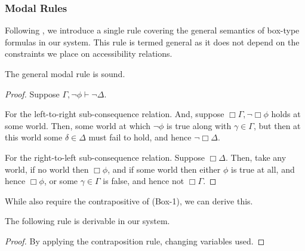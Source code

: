 \documentclass[10pt]{article}
\begin{document}
\subsubsection{Modal Rules}
\label{sec:modal-rules}

Following \citeauthor{Jaspars:1996aa}, we introduce a single rule covering the general semantics of box-type formulas in our system.
This rule is termed general as it does not depend on the constraints we place on accessibility relations.


\begin{lemma}[Soundness]
  The general modal rule is sound.
  \begin{proof}
    Suppose \(\Gamma,\lnot\phi \vdash \lnot\Delta\).

    For the left-to-right sub-consequence relation. And, suppose \(\Box\Gamma, \lnot\Box\phi\) holds at some world. Then, some world at which \(\lnot\phi\) is true along with \(\gamma \in \Gamma\), but then at this world some \(\delta \in \Delta\) must fail to hold, and hence \(\lnot\Box\Delta\).

    For the right-to-left sub-consequence relation. Suppose \(\Box\Delta\). Then, take any world, if no world then \(\Box\phi\), and if some world then either \(\phi\) is true at all, and hence \(\Box\phi\), or some \(\gamma \in \Gamma\) is false, and hence not \(\Box\Gamma\).
  \end{proof}
\end{lemma}

While \citeauthor{Jaspars:1996aa} also require the contrapositive of (Box-1), we can derive this.

\begin{proposition}
  The following rule is derivable in our system.
  \begin{proof}
    By applying the contraposition rule, changing variables used.
  \end{proof}
\end{proposition}
\end{document}
